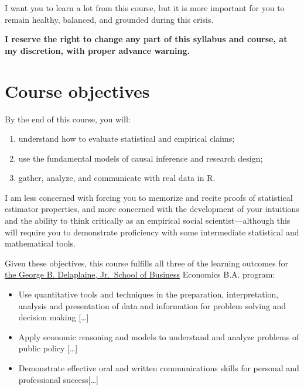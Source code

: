 \documentclass{article}
\providecommand{\tightlist}{%
  \setlength{\itemsep}{0pt}\setlength{\parskip}{0pt}}
\begin{document}
I want you to learn a lot from this course, but it is more important for
you to remain healthy, balanced, and grounded during this crisis.

\textbf{I reserve the right to change any part of this syllabus and
course, at my discretion, with proper advance warning.}

\hypertarget{course-objectives}{%
\section{Course objectives}\label{course-objectives}}

{By the end of this course,} you will:

\begin{enumerate}
\def\labelenumi{\arabic{enumi}.}
\tightlist
\item
  understand how to evaluate statistical and empirical claims;
\item
  use the fundamental models of causal inference and research design;
\item
  gather, analyze, and communicate with real data in R.
\end{enumerate}

I am less concerned with forcing you to memorize and recite proofs of
statistical estimator properties, and more concerned with the
development of your intuitions and the ability to think critically as an
empirical social scientist---although this will require you to
demonstrate proficiency with some intermediate statistical and
mathematical tools.

Given these objectives, this course fulfills all three of the learning
outcomes for
\href{https://www.hood.edu/academics/departments/george-b-delaplaine-jr-school-business/student-learning-outcomes}{the
George B. Delaplaine, Jr.~School of Business} Economics B.A. program:

\begin{itemize}
\tightlist
\item
  Use quantitative tools and techniques in the preparation,
  interpretation, analysis and presentation of data and information for
  problem solving and decision making {[}\ldots{]}
\item
  Apply economic reasoning and models to understand and analyze problems
  of public policy {[}\ldots{]}
\item
  Demonstrate effective oral and written communications skills for
  personal and professional success{[}\ldots{]}
\end{itemize}
\end{document}
